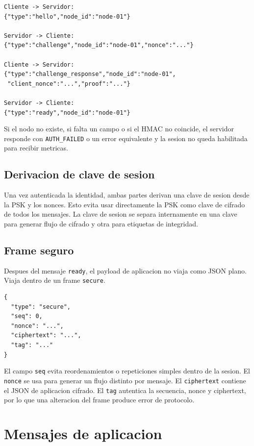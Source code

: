 \documentclass[11pt,letterpaper]{article}
\begin{document}
\begin{lstlisting}[style=json]
Cliente -> Servidor:
{"type":"hello","node_id":"node-01"}

Servidor -> Cliente:
{"type":"challenge","node_id":"node-01","nonce":"..."}

Cliente -> Servidor:
{"type":"challenge_response","node_id":"node-01",
 "client_nonce":"...","proof":"..."}

Servidor -> Cliente:
{"type":"ready","node_id":"node-01"}
\end{lstlisting}

Si el nodo no existe, si falta un campo o si el HMAC no coincide, el servidor
responde con \texttt{AUTH\_FAILED} o un error equivalente y la sesion no queda
habilitada para recibir metricas.

\subsection{Derivacion de clave de sesion}

Una vez autenticada la identidad, ambas partes derivan una clave de sesion desde
la PSK y los nonces. Esto evita usar directamente la PSK como clave de cifrado de
todos los mensajes. La clave de sesion se separa internamente en una clave para
generar flujo de cifrado y otra para etiquetas de integridad.

\subsection{Frame seguro}

Despues del mensaje \texttt{ready}, el payload de aplicacion no viaja como JSON
plano. Viaja dentro de un frame \texttt{secure}.

\begin{lstlisting}[style=json]
{
  "type": "secure",
  "seq": 0,
  "nonce": "...",
  "ciphertext": "...",
  "tag": "..."
}
\end{lstlisting}

El campo \texttt{seq} evita reordenamientos o repeticiones simples dentro de la
sesion. El \texttt{nonce} se usa para generar un flujo distinto por mensaje. El
\texttt{ciphertext} contiene el JSON de aplicacion cifrado. El \texttt{tag}
autentica la secuencia, nonce y ciphertext, por lo que una alteracion del frame
produce error de protocolo.

\newpage
\section{Mensajes de aplicacion}
\end{document}

